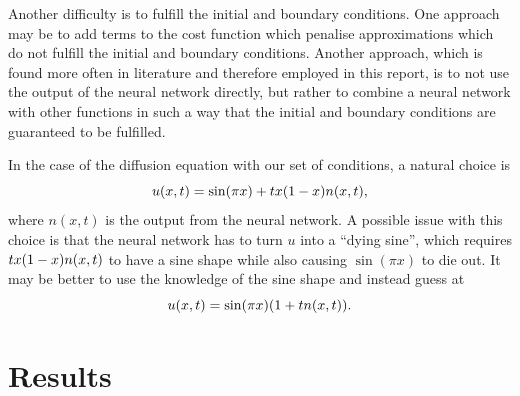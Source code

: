\documentclass[11pt,british,a4paper]{article}
\numberwithin{equation}{section}
\begin{document}
Another difficulty is to fulfill the initial and boundary conditions. One approach may be to add terms to the cost function which penalise approximations which do not fulfill the initial and boundary conditions. Another approach, which is found more often in literature\cite{nnde} and therefore employed in this report, is to not use the output of the neural network directly, but rather to combine a neural network with other functions in such a way that the initial and boundary conditions are guaranteed to be fulfilled.

In the case of the diffusion equation with our set of conditions, a natural choice is
\begin{equation}
    u(x,t) = \sin(\pi x) + tx\qty(1-x)n(x,t),
\end{equation}
where \(n(x,t)\) is the output from the neural network. A possible issue with this choice is that the neural network has to turn \(u\) into a ``dying sine'', which requires \(tx\qty(1-x)n(x,t)\) to have a sine shape while also causing \(\sin(\pi x)\) to die out. It may be better to use the knowledge of the sine shape and instead guess at
\begin{equation}
    u(x,t) = \sin(\pi x)\qty(1+tn(x,t)).
\end{equation}

\section{Results}
\end{document}
